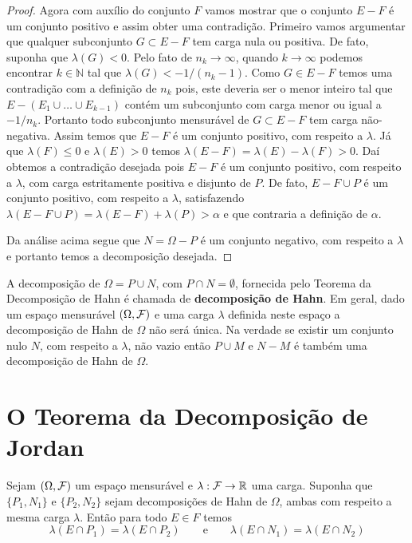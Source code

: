 \begin{proof}
Agora com auxílio do conjunto $F$ vamos mostrar que o 
conjunto $E-F$ é um conjunto positivo e assim obter uma contradição.
Primeiro vamos argumentar que qualquer subconjunto 
$G\subset E-F$ tem carga nula ou positiva. 
De fato, suponha que $\lambda(G)<0$. 
Pelo fato de $n_k\to\infty$, quando $k\to\infty$ 
podemos encontrar $k\in\mathbb{N}$ tal que 
$\lambda(G)<-1/(n_k-1)$. Como $G\in E-F$ temos
uma contradição com a definição de $n_k$
pois, este deveria ser o menor inteiro tal que 
$E-(E_1\cup\ldots\cup E_{k-1})$
contém um subconjunto com carga menor ou igual 
a $-1/n_k$. Portanto todo subconjunto mensurável 
de $G\subset E-F$ tem carga não-negativa.
Assim temos que $E-F$ é um conjunto positivo,
com respeito a $\lambda$. 
Já que $\lambda(F)\leq 0$ e $\lambda(E)>0$ temos  
$\lambda(E-F)=\lambda(E)-\lambda(F)>0$.
Daí obtemos a contradição desejada pois 
$E-F$ é um conjunto positivo, com respeito a $\lambda$,
com carga estritamente positiva e disjunto de $P$. De fato,
$E-F\cup P$ é um conjunto positivo, com respeito a $\lambda$,
satisfazendo $\lambda(E-F\cup P)= \lambda(E-F)+\lambda(P)>\alpha$
e que contraria a definição de $\alpha$. 

Da análise acima segue que $N=\Omega-P$ é um 
conjunto negativo, com respeito a $\lambda$ e 
portanto temos a decomposição desejada.
\end{proof}





\begin{observacao}
	A decomposição de $\Omega=P\cup N$, com $P\cap N=\emptyset$, 
	fornecida pelo Teorema da Decomposição 
	de Hahn é chamada de {\bf decomposição de Hahn}. 
	Em geral, dado um espaço mensurável $(\Omega,\mathcal{F})$ e 
	uma carga $\lambda$ definida neste espaço a decomposição de
	Hahn de $\Omega$ não será única. Na verdade se existir um
	conjunto nulo $N$, com respeito a $\lambda$, não vazio 
	então $P\cup M$ e $N-M$ é também uma decomposição de 
	Hahn de $\Omega$.
\end{observacao}

 









\section{O Teorema da Decomposição de Jordan}

\begin{lema}
	Sejam $(\Omega,\mathcal{F})$ um espaço mensurável e $\lambda:\mathcal{F}\to\mathbb{R}$
	uma carga. Suponha que $\{P_1,N_1\}$ e $\{P_2,N_2\}$ sejam
	decomposições de Hahn de $\Omega$, ambas com respeito a mesma
	carga $\lambda$. Então para todo $E\in F$ temos 
	\[
	\lambda(E \cap P_1) = \lambda(E \cap P_2)
	\qquad\text{e}\qquad
	\lambda(E \cap N_1) = \lambda(E \cap N_2)
	\]
\end{lema}